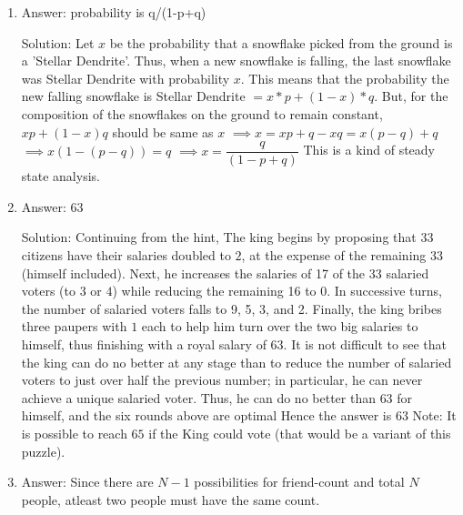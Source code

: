\begin{enumerate}

\item
Answer: probability is q/(1-p+q)
 
Solution: Let $x$ be the probability that a snowflake picked from the ground is a 'Stellar Dendrite'. Thus, when a new snowflake is falling, the last snowflake was Stellar Dendrite with probability $x$.
This means that the probability the new falling snowflake is Stellar Dendrite $= x*p + (1-x)*q$. But, for the composition of the snowflakes on the ground to remain constant, $xp+(1-x)q$ should be same as $x$
$\implies x = xp + q - xq = x(p-q) + q $
$\implies x (1- (p-q)) = q $
$\implies x = \dfrac{q}{ (1- p + q)} $
This is a kind of steady state analysis.




\item
Answer: 63
 
Solution: Continuing from the hint, The king begins by proposing that 33 citizens have their salaries doubled to $2$, at the expense of the remaining 33 (himself included). Next, he increases the salaries of 17 of the 33 salaried voters (to $3$ or $4$) while reducing the remaining 16 to $0$. In successive turns, the number of salaried voters falls to 9, 5, 3, and 2. Finally, the king bribes three paupers with $1$ each to help him turn over the two big salaries to himself, thus finishing with a royal salary of $63$. It is not difficult to see that the king can do no better at any stage than to reduce the number of salaried voters to just over half the previous number; in particular, he can never achieve a unique salaried voter. Thus, he can do no better than $63$ for himself, and the six rounds above are optimal
Hence the answer is $63$
Note: It is possible to reach $65$ if the King could vote (that would be a variant of this puzzle).




\item
Answer: Since there are $N-1$ possibilities for friend-count and total $N$ people, atleast two people must have the same count.
 

\end{enumerate}
